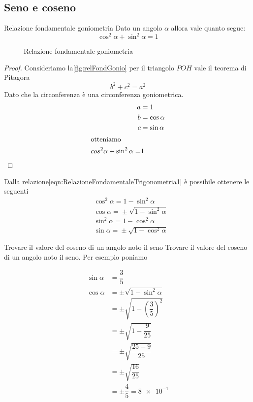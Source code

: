 \subsection{Seno e coseno}
\label{sec:RelazioniFondamentaliSenoCoseno}
\begin{teoremat}{Relazione fondamentale goniometria}{}
Dato un angolo $\alpha$ allora vale quanto segue:
\begin{equation*}
\cos^2\alpha+\sin^2\alpha=1\label{eqn:RelazioneFondamentaleTrigonometria1}
\end{equation*}
\end{teoremat}
\begin{figure}
	\centering
	
\caption{Relazione fondamentale goniometria}\label{fig:relFondGonio}
\end{figure}
\begin{proof}
	Consideriamo la\nobs\vref{fig:relFondGonio} per il triangolo $POH$ vale il teorema di Pitagora \[b^2+c^2=a^2\] Dato che la circonferenza è una circonferenza goniometrica.
	\begin{align*}
	a&=1\\
	b&=\cos\alpha\\
	c&=\sin\alpha\\
	\intertext{otteniamo}
	cos^2\alpha+\sin^2\alpha=&1 \\
	\end{align*}
\end{proof}
Dalla relazione\nobs\vref{eqn:RelazioneFondamentaleTrigonometria1} è possibile ottenere le seguenti
\begin{align*}
&\cos^{2}\alpha={}1-\sin^{2}\alpha\\
&\cos\alpha={}\pm\sqrt{1-\sin^{2}\alpha}\\
&\sin^{2}\alpha={}1-\cos^{2}\alpha \\
&\sin\alpha={}\pm\sqrt{1-\cos^{2}\alpha}
\end{align*}
\begin{esempiot}{Trovare il valore del coseno di un angolo noto il seno}{}
Trovare il valore del coseno di un angolo noto il seno. Per esempio poniamo 
\end{esempiot}
\begin{align*}
\sin\alpha&{}=\dfrac{3}{5}\\
\cos\alpha&=\pm\sqrt{1-\sin^2\alpha}\\
&=\pm\sqrt{1-\left(\dfrac{3}{5}\right)^2}\\
&=\pm\sqrt{1-\dfrac{9}{25}}\\
&=\pm\sqrt{\dfrac{25-9}{25}}\\
&=\pm\sqrt{\dfrac{16}{25}} \\
&=\pm\dfrac{4}{5}=\num{8e-1} 
\end{align*}
